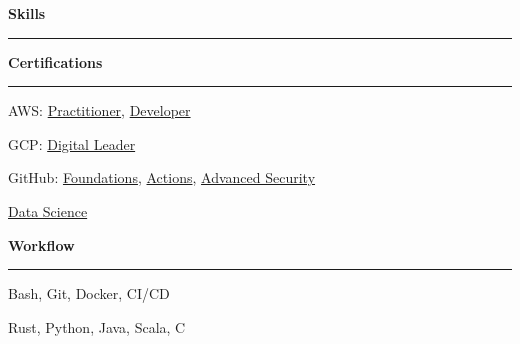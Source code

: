 \documentclass[11pt,letterpaper]{article}
\begin{document}
\begin{justify}
      {\large \textbf{Skills}\strut}
      \hrule
      \begin{minipage}[t]{9.1cm}
            \textbf{Certifications}\strut
            \hrule
            \vspace{0.2cm}
            \begin{itemize}[label={}, leftmargin=0pt]
                  \begin{item}
                        AWS:
                        \href{https://www.credly.com/badges/33614ca6-2f0d-456b-87e9-bf8b8591cbf8/public_url}{Practitioner},
                        \href{https://www.credly.com/badges/e9b6c64c-2175-4345-950b-6331fd88af43/public_url}{Developer}
                  \end{item}
                  \begin{item}
                        GCP:
                        \href{https://www.credly.com/badges/0f158c45-adb0-4ac9-9d5f-0039649e4808/public_url}{Digital Leader}
                  \end{item}
                  \begin{item}
                        GitHub:
                        \href{https://www.credly.com/badges/0f59d53a-1ecb-4f6f-8a84-96fa3cb55965/public_url}{Foundations},
                        \href{https://www.credly.com/badges/6da40853-2bc6-4738-887e-8710a10e7a29/public_url}{Actions},
                        \href{https://www.credly.com/badges/b3c3ae21-61a9-4519-85d6-29a3bb8c443a/public_url}{Advanced Security}
                  \end{item}
                  \begin{item}
                        \href{https://dariocurr.github.io/assets/doc/data_science.pdf}{Data Science}
                  \end{item}
            \end{itemize}
      \end{minipage}
      \hfill
      \begin{minipage}[t]{5.4cm}
            \textbf{Workflow}\strut
            \hrule
            \vspace{0.2cm}
            \begin{itemize}[label={}, leftmargin=0pt]
                  \begin{item}
                        Bash, Git, Docker, CI/CD
                  \end{item}
                  \begin{item}
                        Rust, Python, Java, Scala, C
                  \end{item}

\end{itemize}
\end{minipage}
\end{justify}
\end{document}
